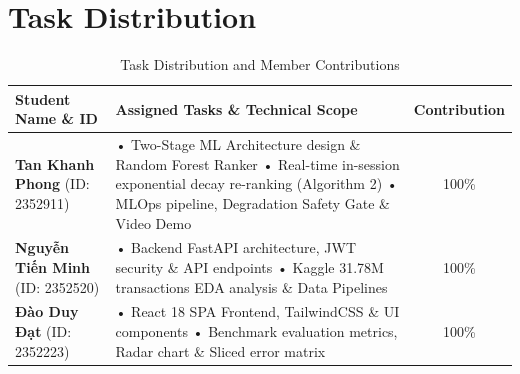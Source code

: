 \documentclass[11pt,a4paper]{article}
\begin{document}
\newpage
\setcounter{tocdepth}{2}
\tableofcontents
\newpage

\section*{Task Distribution}

\begin{table}[H]
\centering
{}
\begin{tabular}{|m{4.5cm}|m{8.5cm}|c|}
\hline
\rowcolor{gray!20} \textbf{Student Name \& ID} & \textbf{Assigned Tasks \& Technical Scope} & \textbf{Contribution} \\ \hline
\textbf{Tan Khanh Phong} \newline (ID: 2352911) & 
• Two-Stage ML Architecture design \& Random Forest Ranker \newline
• Real-time in-session exponential decay re-ranking (Algorithm 2) \newline
• MLOps pipeline, Degradation Safety Gate \& Video Demo & 100\% \\ \hline
\textbf{Nguyễn Tiến Minh} \newline (ID: 2352520) & 
• Backend FastAPI architecture, JWT security \& API endpoints \newline
• Kaggle 31.78M transactions EDA analysis \& Data Pipelines & 100\% \\ \hline
\textbf{Đào Duy Đạt} \newline (ID: 2352223) & 
• React 18 SPA Frontend, TailwindCSS \& UI components \newline
• Benchmark evaluation metrics, Radar chart \& Sliced error matrix & 100\% \\ \hline
\end{tabular}
\caption{Task Distribution and Member Contributions}
\end{table}

\newpage











\newpage
\nocite{*}
\end{document}
